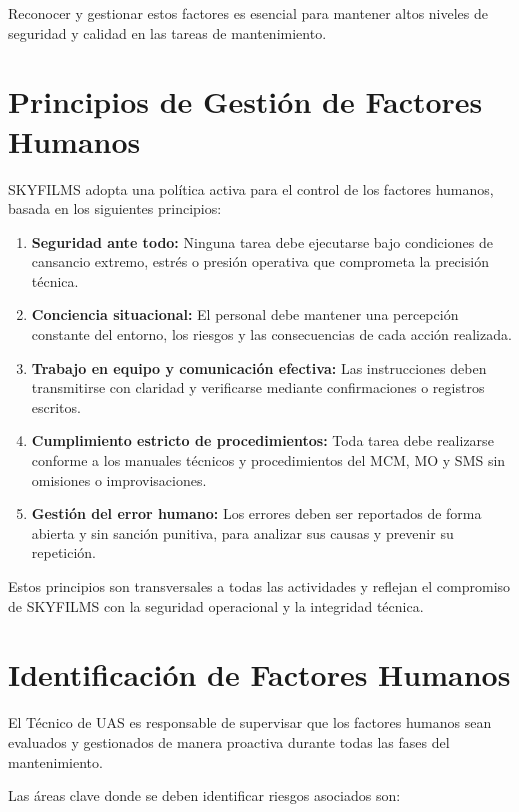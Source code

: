 Reconocer y gestionar estos factores es esencial para mantener altos niveles de seguridad y calidad en las tareas de mantenimiento.

\section{Principios de Gestión de Factores Humanos}
SKYFILMS adopta una política activa para el control de los factores humanos, basada en los siguientes principios:

\begin{enumerate}
    \item \textbf{Seguridad ante todo:} Ninguna tarea debe ejecutarse bajo condiciones de cansancio extremo, estrés o presión operativa que comprometa la precisión técnica.

    \item \textbf{Conciencia situacional:} El personal debe mantener una percepción constante del entorno, los riesgos y las consecuencias de cada acción realizada.

    \item \textbf{Trabajo en equipo y comunicación efectiva:} Las instrucciones deben transmitirse con claridad y verificarse mediante confirmaciones o registros escritos.

    \item \textbf{Cumplimiento estricto de procedimientos:} Toda tarea debe realizarse conforme a los manuales técnicos y procedimientos del MCM, MO y SMS sin omisiones o improvisaciones.

    \item \textbf{Gestión del error humano:} Los errores deben ser reportados de forma abierta y sin sanción punitiva, para analizar sus causas y prevenir su repetición.
\end{enumerate}

Estos principios son transversales a todas las actividades y reflejan el compromiso de SKYFILMS con la seguridad operacional y la integridad técnica.

\section{Identificación de Factores Humanos}
El Técnico de UAS es responsable de supervisar que los factores humanos sean evaluados y gestionados de manera proactiva durante todas las fases del mantenimiento.

Las áreas clave donde se deben identificar riesgos asociados son:

